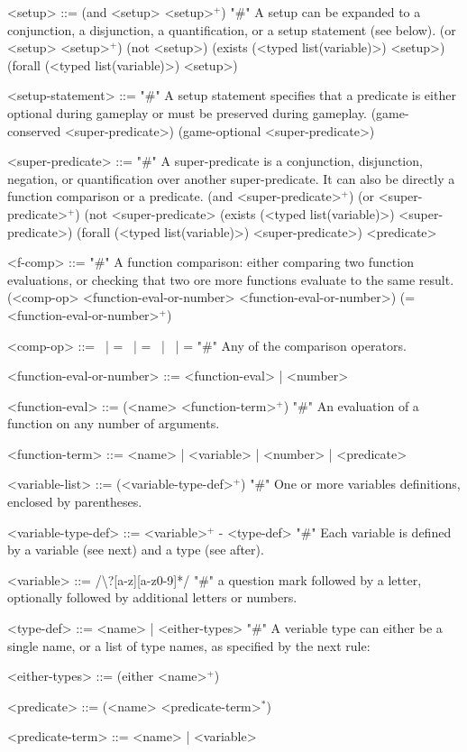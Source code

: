 \documentclass{article}
\begin{document}
\begin{grammar}
<setup> ::= (and <setup> <setup>$^+$) "#" A setup can be expanded to a conjunction, a disjunction, a quantification, or a setup statement (see below).
    \alt (or <setup> <setup>$^+$)
    \alt (not <setup>)
    \alt (exists (<typed list(variable)>) <setup>)
    \alt (forall (<typed list(variable)>) <setup>)

<setup-statement> ::= "#" A setup statement specifies that a predicate is either optional during gameplay or must be preserved during gameplay.
    \alt (game-conserved <super-predicate>)
    \alt (game-optional <super-predicate>)

<super-predicate> ::= "#" A super-predicate is a conjunction, disjunction, negation, or quantification over another super-predicate. It can also be directly a function comparison or a predicate.
    \alt (and <super-predicate>$^+$)
    \alt (or <super-predicate>$^+$)
    \alt (not <super-predicate>
    \alt (exists (<typed list(variable)>) <super-predicate>)
    \alt (forall (<typed list(variable)>) <super-predicate>)
    \alt <predicate>


<f-comp> ::= "#" A function comparison: either comparing two function evaluations, or checking that two ore more functions evaluate to the same result.
    \alt (<comp-op> <function-eval-or-number> <function-eval-or-number>)
    \alt (= <function-eval-or-number>$^+$)

<comp-op> ::=  \textlangle \ | \textlangle = \ | = \ | \textrangle \ | \textrangle = "#" Any of the comparison operators.

<function-eval-or-number> ::= <function-eval> | <number>

<function-eval> ::= (<name> <function-term>$^+$) "#" An evaluation of a function on any number of arguments.

<function-term> ::= <name> | <variable> | <number> | <predicate>

<variable-list> ::= (<variable-type-def>$^+$) "#" One or more variables definitions, enclosed by parentheses.

<variable-type-def> ::= <variable>$^+$ - <type-def> "#" Each variable is defined by a variable (see next) and a type (see after).

<variable> ::= /\textbackslash?[a-z][a-z0-9]*/  "#" a question mark followed by a letter, optionally followed by additional letters or numbers.

<type-def> ::= <name> | <either-types> "#" A veriable type can either be a single name, or a list of type names, as specified by the next rule:

<either-types> ::= (either <name>$^+$)

<predicate> ::= (<name> <predicate-term>$^*$)

<predicate-term> ::= <name> | <variable>


\end{grammar}
\end{document}
